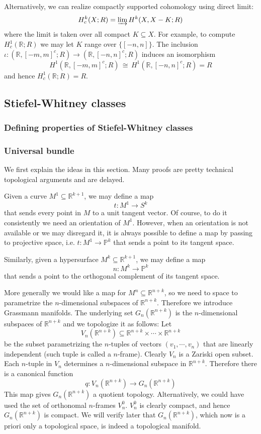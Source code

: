 \documentclass[12pt]{article}
\theoremstyle{plain}
\theoremstyle{definition}
\newcommand{\IP}{\mathbb{P}}
\newcommand{\IR}{\mathbb{R}}
\newcommand\iso{\,{\cong}\,}
\newcommand{\<}{\langle}
\renewcommand{\>}{\rangle}
\begin{document}
Alternatively, we can realize compactly supported cohomology using direct limit:
$$ H^k_c(X; R) = \varinjlim H^k(X, X - K; R) $$
where the limit is taken over all compact $K \subseteq X$. For example, to compute $H^1_c(\IR; R)$ we may let $K$ range over $\{[-n, n]\}$. The inclusion $\iota : (\IR, [-m, m]^c;R) \to (\IR, [-n, n]^c; R)$ induces an isomorphism $$H^1(\IR, [-m, m]^c; R) \iso H^1(\IR, [-n, n]^c; R) = R$$ and hence $H^1_c(\IR; R) = R$. 


\subsection{Stiefel-Whitney classes}
\subsubsection{Defining properties of Stiefel-Whitney classes}

\subsubsection{Universal bundle}
We first explain the ideas in this section. Many proofs are pretty technical topological arguments and are delayed. 

Given a curve $M^1 \subseteq \IR^{k + 1}$, we may define a map $$t : M^1 \to S^k$$ that sends every point in $M$ to a unit tangent vector. Of course, to do it consistently we need an orientation of $M^1$. However, when an orientation is not available or we may disregard it, it is always possible to define a map by passing to projective space, i.e. $t : M^1 \to \IP^k$ that sends a point to its tangent space. 

Similarly, given a hypersurface $M^k \subseteq \IR^{k + 1}$, we may define a map $$ n : M^k \to \IP^k$$ that sends a point to the orthogonal complement of its tangent space. 

More generally we would like a map for $M^n \subseteq \IR^{n + k}$, so we need to space to parametrize the $n$-dimensional subspaces of $\IR^{n + k}$. Therefore we introduce Grassmann manifolds. The underlying set $G_n(\IR^{n + k})$ is the $n$-dimensional subspaces of $\IR^{n + k}$ and we topologize it as follows: Let $$V_n(\IR^{n + k}) \subseteq \IR^{n + k} \times \cdots \times \IR^{n + k}$$ be the subset parametrizing the $n$-tuples of vectors $(v_1, \cdots, v_n)$ that are linearly independent (such tuple is called a $n$-frame). Clearly $V_n$ is a Zariski open subset. Each $n$-tuple in $V_n$ determines a $n$-dimensional subspace in $\IR^{n + k}$. Therefore there is a canonical function 
$$ q : V_n(\IR^{n + k}) \to G_n (\IR^{n + k}) $$ 
This map gives $G_n (\IR^{n + k})$ a quotient topology. Alternatively, we could have used the set of orthonomal $n$-frames $V^0_{n}$. $V^0_{n}$ is clearly compact, and hence $G_n (\IR^{n + k})$ is compact. We will verify later that $G_n (\IR^{n + k})$, which now is a priori only a topological space, is indeed a topological manifold. 
\end{document}
